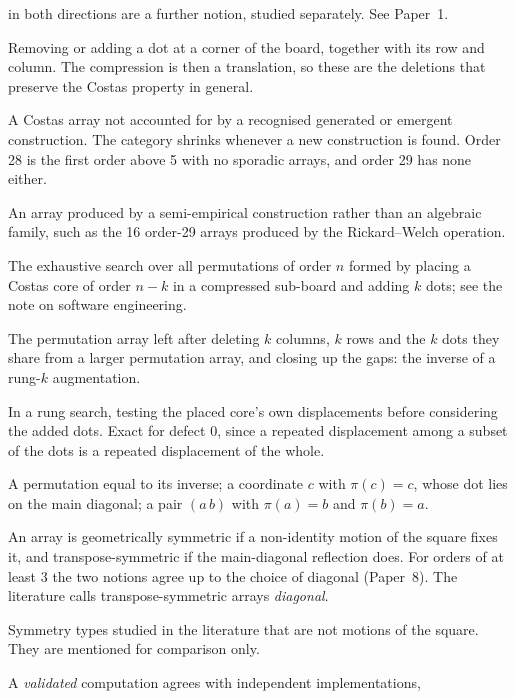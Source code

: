 \begin{description}[style=nextline,leftmargin=0pt,itemsep=2pt]
in both directions are a further notion, studied separately. See Paper~1.
\item[Corner deletion, corner addition] Removing or adding a dot at a corner of the board, together
with its row and column. The compression is then a translation, so these are the deletions that
preserve the Costas property in general.
\item[Sporadic array] A Costas array not accounted for by a recognised generated or emergent
construction. The category shrinks whenever a new construction is found. Order 28 is the first
order above 5 with no sporadic arrays, and order 29 has none either.
\item[Emergent array] An array produced by a semi-empirical construction rather than an algebraic
family, such as the 16 order-29 arrays produced by the Rickard--Welch operation.
\item[Augmentation rung] The exhaustive search over all permutations of order $n$ formed by placing
a Costas core of order $n-k$ in a compressed sub-board and adding $k$ dots; see the note on software
engineering.
\item[Deletion minor] The permutation array left after deleting $k$ columns, $k$ rows and the $k$
dots they share from a larger permutation array, and closing up the gaps: the inverse of a rung-$k$
augmentation.
\item[Core-first pruning] In a rung search, testing the placed core's own displacements before
considering the added dots. Exact for defect 0, since a repeated displacement among a subset of the
dots is a repeated displacement of the whole.
\item[Involution, fixed point, transposition] A permutation equal to its inverse; a coordinate $c$
with $\pi(c)=c$, whose dot lies on the main diagonal; a pair $(a\,b)$ with $\pi(a)=b$ and $\pi(b)=a$.
\item[Geometric and transpose symmetry] An array is geometrically symmetric if a non-identity motion
of the square fixes it, and transpose-symmetric if the main-diagonal reflection does. For orders of
at least 3 the two notions agree up to the choice of diagonal (Paper~8). The literature calls
transpose-symmetric arrays \emph{diagonal}.
\item[Anti-reflective and consecutive arrays] Symmetry types studied in the literature that are not
motions of the square. They are mentioned for comparison only.
\item[Levels of assurance] A \emph{validated} computation agrees with independent implementations,

\end{description}
